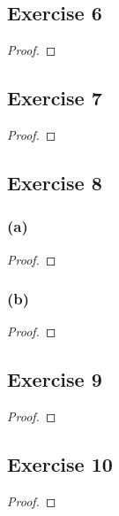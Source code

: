 \documentclass[14pt]{extarticle}
\begin{document}
\subsection{Exercise 6}

\begin{proof}

\end{proof}

\subsection{Exercise 7}

\begin{proof}

\end{proof}

\subsection{Exercise 8}

\subsubsection{(a)}

\begin{proof}

\end{proof}

\subsubsection{(b)}

\begin{proof}

\end{proof}

\subsection{Exercise 9}

\begin{proof}

\end{proof}

\subsection{Exercise 10}

\begin{proof}

\end{proof}
\end{document}
